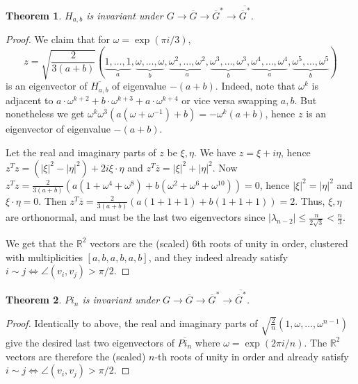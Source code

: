 \documentclass[11pt]{article}
\newtheorem{thm}{Theorem}[section]
\begin{document}
\begin{thm}\label{thm:H-invariant}
    $H_{a,b}$ is invariant under $G \to \overline{G} \to \overline{G}^* \to \overline{\overline{G}^*}$.
\end{thm}
\begin{proof}
    We claim that for $\omega = \exp(\pi i/3)$,
    \[z = \sqrt{\frac{2}{3(a+b)}}(\underbrace{1, \dots, 1}_a, \underbrace{\omega, \dots, \omega}_b, \underbrace{\omega^2, \dots, \omega^2}_a, \underbrace{\omega^3, \dots, \omega^3}_b, \underbrace{\omega^4, \dots, \omega^4}_a, \underbrace{\omega^5, \dots, \omega^5}_b)\]
    is an eigenvector of $\overline{H_{a, b}}$ of eigenvalue $-(a+b)$. Indeed, note that $\omega^k$ is adjacent to $a \cdot \omega^{k+2} + b \cdot \omega^{k+3} + a \cdot \omega^{k+4}$ or vice versa swapping $a, b$. But nonetheless we get $\omega^k \omega^3 (a(\omega + \omega^{-1}) + b) = -\omega^k(a+b)$, hence $z$ is an eigenvector of eigenvalue $-(a+b)$. 
    
    Let the real and imaginary parts of $z$ be $\xi, \eta$. We have $z = \xi + i\eta$, hence $z^T z = (|\xi|^2 - |\eta|^2) + 2i\xi \cdot \eta$ and $z^T \overline{z} = |\xi|^2 + |\eta|^2$. Now $z^T z = \frac{2}{3(a+b)}(a(1 + \omega^4 + \omega^8) + b(\omega^2 + \omega^6 + \omega^{10})) = 0$, hence $|\xi|^2 = |\eta|^2$ and $\xi \cdot \eta = 0$. Then $z^T \overline{z} = \frac{2}{3(a+b)}(a(1 + 1 + 1) + b(1 + 1 + 1)) = 2$. Thus, $\xi, \eta$ are orthonormal, and must be the last two eigenvectors since $|\lambda_{n-2}| \le \frac{n}{2\sqrt{3}} < \frac{n}{3}$. 
    
    We get that the $\mathbb{R}^2$ vectors are the (scaled) $6$th roots of unity in order, clustered with multiplicities $[a,b,a,b,a,b]$, and they indeed already satisfy $i \sim j \iff \angle(v_i, v_j) > \pi/2$.
\end{proof}

\begin{thm}\label{thm:pivalous-invariant}
    $Pi_n$ is invariant under $G \to \overline{G} \to \overline{G}^* \to \overline{\overline{G}^*}$.
\end{thm}
\begin{proof}
    Identically to above, the real and imaginary parts of $\sqrt{\frac{2}{n}}(1, \omega, \dots, \omega^{n-1})$ give the desired last two eigenvectors of $\overline{Pi_n}$ where $\omega = \exp(2\pi i/n)$. The $\mathbb{R}^2$ vectors are therefore the (scaled) $n$-th roots of unity in order and already satisfy $i \sim j \iff \angle(v_i, v_j) > \pi/2$. 
\end{proof}
\end{document}
